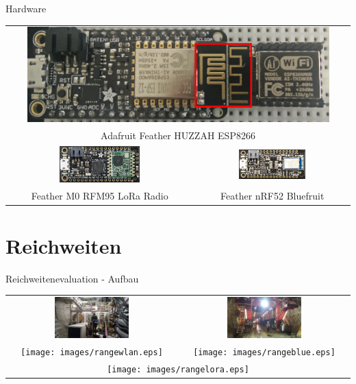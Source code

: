 \documentclass[18pt]{beamer}
\begin{document}
\begin{frame}{Hardware}
	\begin{tabular}{cc}
		\multicolumn{2}{c}{\includegraphics[width=0.9\textwidth]{images/espmodules.png}}\\
		\multicolumn{2}{c}{Adafruit Feather HUZZAH ESP8266}\\
		\includegraphics[width=0.45\textwidth]{images/loraada.png} & \includegraphics[width=0.45\textwidth]{images/nrf52ada.png}\\
		Feather M0 RFM95 LoRa Radio & Feather nRF52 Bluefruit\\
	\end{tabular}
\end{frame}

\section{Reichweiten}
\begin{frame}{Reichweitenevaluation - Aufbau}
	\begin{tabular}{cc}
		\includegraphics[width=0.45\textwidth]{images/tunnel.jpg} & \includegraphics[width=0.45\textwidth]{images/schalungswagen.jpg}\\
		\texttt{[image: images/rangewlan.eps]} & \texttt{[image: images/rangeblue.eps]} \\
		\multicolumn{2}{c}{\texttt{[image: images/rangelora.eps]}}\\
	\end{tabular}
\end{frame}
\end{document}
